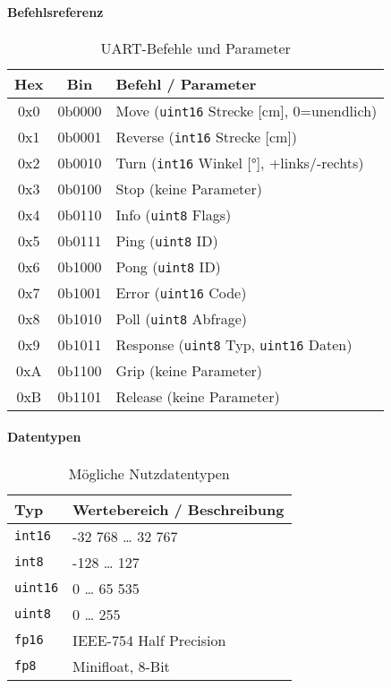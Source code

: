 \documentclass[main.tex]{subfiles} %
\begin{document}
\paragraph{Befehlsreferenz}
\begin{table}[h!]
  \centering
  \begin{tabular}{>{\ttfamily}c >{\ttfamily}c l}
    \toprule
    \textnormal{Hex} & \textnormal{Bin} & \textnormal{Befehl / Parameter} \\
    \midrule
    0x0 & 0b0000 & Move (\texttt{uint16} Strecke [cm], 0=unendlich) \\
    0x1 & 0b0001 & Reverse (\texttt{int16} Strecke [cm]) \\
    0x2 & 0b0010 & Turn (\texttt{int16} Winkel [°], +links/-rechts) \\
    0x3 & 0b0100 & Stop (keine Parameter) \\
    0x4 & 0b0110 & Info (\texttt{uint8} Flags) \\
    0x5 & 0b0111 & Ping (\texttt{uint8} ID) \\
    0x6 & 0b1000 & Pong (\texttt{uint8} ID) \\
    0x7 & 0b1001 & Error (\texttt{uint16} Code) \\
    0x8 & 0b1010 & Poll (\texttt{uint8} Abfrage) \\
    0x9 & 0b1011 & Response (\texttt{uint8} Typ, \texttt{uint16} Daten) \\
    0xA & 0b1100 & Grip (keine Parameter) \\
    0xB & 0b1101 & Release (keine Parameter) \\
    \bottomrule
  \end{tabular}
  \caption{UART-Befehle und Parameter}
  \label{tab:uart_cmds}
\end{table}

\paragraph{Datentypen}
\begin{table}[h!]
  \centering
  \begin{tabular}{l l}
    \toprule
    \textbf{Typ} & \textbf{Wertebereich / Beschreibung} \\
    \midrule
    \texttt{int16} & -32 768 … 32 767 \\
    \texttt{int8}  & -128 … 127 \\
    \texttt{uint16} & 0 … 65 535 \\
    \texttt{uint8} & 0 … 255 \\
    \texttt{fp16} & IEEE-754 Half Precision \\
    \texttt{fp8}  & Minifloat, 8-Bit \\
    \bottomrule
  \end{tabular}
  \caption{Mögliche Nutzdatentypen}
  \label{tab:uart_types}
\end{table}
\end{document}
